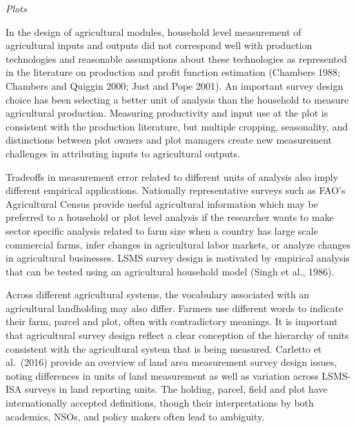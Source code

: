 \documentclass[
]{book}
\begin{document}
\emph{Plots}

In the design of agricultural modules, household level measurement of agricultural inputs and outputs did not correspond well with production technologies and reasonable assumptions about these technologies as represented in the literature on production and profit function estimation (Chambers 1988; Chambers and Quiggin 2000; Just and Pope 2001). An important survey design choice has been selecting a better unit of analysis than the household to measure agricultural production. Measuring productivity and input use at the plot is consistent with the production literature, but multiple cropping, seasonality, and distinctions between plot owners and plot managers create new measurement challenges in attributing inputs to agricultural outputs.

Tradeoffs in measurement error related to different units of analysis also imply different empirical applications. Nationally representative surveys such as FAO's Agricultural Census provide useful agricultural information which may be preferred to a household or plot level analysis if the researcher wants to make sector specific analysis related to farm size when a country has large scale commercial farms, infer changes in agricultural labor markets, or analyze changes in agricultural businesses. LSMS survey design is motivated by empirical analysis that can be tested using an agricultural household model (Singh et al., 1986).

Across different agricultural systems, the vocabulary associated with an agricultural landholding may also differ. Farmers use different words to indicate their farm, parcel and plot, often with contradictory meanings. It is important that agricultural survey design reflect a clear conception of the hierarchy of units consistent with the agricultural system that is being measured. Carletto et al.~(2016) provide an overview of land area measurement survey design issues, noting differences in units of land measurement as well as variation across LSMS-ISA surveys in land reporting units. The holding, parcel, field and plot have internationally accepted definitions, though their interpretations by both academics, NSOs, and policy makers often lead to ambiguity.
\end{document}
